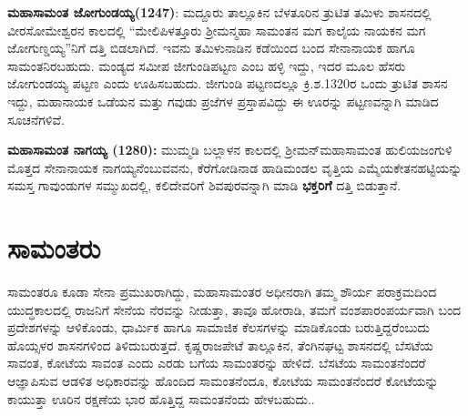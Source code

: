 \textbf{ಮಹಾಸಾಮಂತ ಜೋಗುಂಡಯ್ಯ(1247)}: ಮದ್ದೂರು ತಾಲ್ಲೂಕಿನ ಬೆಳತೂರಿನ ತ್ರುಟಿತ ತಮಿಳು ಶಾಸನದಲ್ಲಿ ವೀರಸೋಮೇಶ್ವರನ ಕಾಲದಲ್ಲಿ “ಮೇಲಿಪಿಳತ್ತೂರು ಶ‍್ರೀಮನ್ಮಹಾ ಸಾಮಂತನ ಮಗ ಕಾಲೈಯ ನಾಯಕನ ಮಗ \hbox{ಜೋಗುಣ್ಡಯ್ಯ”}\-ನಿಗೆ ದತ್ತಿ ಬಿಡಲಾಗಿದೆ. ಇವನು ತಮಿಳುನಾಡಿನ ಕಡೆಯಿಂದ ಬಂದ ಸೇನಾನಾಯಕ ಹಾಗೂ ಸಾಮಂತನಿರಬಹುದು. ಮಂಡ್ಯದ ಸಮೀಪ ಜೀಗುಂಡಿಪಟ್ಟಣ ಎಂಬ ಹಳ್ಳಿ ಇದ್ದು, ಇದರ ಮೂಲ ಹೆಸರು ಜೋಗುಂಡಯ್ಯ ಪಟ್ಟಣ ಎಂದು ಊಹಿಸಬಹುದು. ಜೀಗುಂಡಿ ಪಟ್ಟಣದಲ್ಲೂ ಕ್ರಿ.ಶ.1320ರ ಒಂದು ತ್ರುಟಿತ ಶಾಸನ ಇದ್ದು, ಮಹಾನಾಯಕ ಒಡೆಯನ ಮತ್ತು ಗವುಡು ಪ್ರಜೆಗಳ ಪ್ರಸ್ತಾಪವಿದ್ದು ಈ ಊರನ್ನು ಪಟ್ಟಣವನ್ನಾಗಿ ಮಾಡಿದ ಸೂಚನೆಗಳಿವೆ.

\textbf{ಮಹಾಸಾಮಂತ ನಾಗಯ್ಯ (1280):} ಮುಮ್ಮಡಿ ಬಲ್ಲಾಳನ ಕಾಲದಲ್ಲಿ ಶ‍್ರೀಮನ್​ ಮಹಾಸಾಮಂತ ಹುಲಿಯಜಂಗುಳಿ ಮೊತ್ತದ ಸೇನಾನಾಯಕ ನಾಗಯ್ಯನೆಂಬುವವನು, ಕೆರೆಗೋಡಿನಾಡ ಹಾಡಿಮಂಡಲ ವೃತ್ತಿಯ ಎಮ್ಮೆಯಕೇತನಹಟ್ಟಿಯನ್ನು ಸಮಸ್ತ ಗಾವುಂಡುಗಳ ಸಮ್ಮುಖದಲ್ಲಿ, ಕಲಿದೇವರಿಗೆ ಶಿವಪುರವನ್ನಾಗಿ ಮಾಡಿ \textbf{ಭಕ್ತರಿಗೆ }ದತ್ತಿ ಬಿಡುತ್ತಾನೆ.


\section*{ಸಾಮಂತರು}

ಸಾಮಂತರೂ ಕೂಡಾ ಸೇನಾ ಪ್ರಮುಖರಾಗಿದ್ದು, ಮಹಾಸಾಮಂತರ ಅಧೀನರಾಗಿ ತಮ್ಮ ಶೌರ್ಯ ಪರಾಕ್ರಮದಿಂದ ಯುದ್ಧಕಾಲದಲ್ಲಿ ರಾಜನಿಗೆ ಸೇನೆಯ ನೆರವನ್ನು ನೀಡುತ್ತಾ, ತಾವೂ ಹೋರಾಡಿ, ತಮಗೆ ವಂಶಪಾರಂಪರ್ಯವಾಗಿ ಬಂದ ಪ್ರದೇಶಗಳನ್ನು ಆಳಿಕೊಂಡು, ಧಾರ್ಮಿಕ ಹಾಗೂ ಸಾಮಾಜಿಕ ಕೆಲಸಗಳನ್ನು ಮಾಡಿಕೊಂಡು ಬರುತ್ತಿದ್ದರೆಂಬುದು ಹೊಯ್ಸಳರ ಶಾಸನಗಳಿಂದ ತಿಳಿದುಬರುತ್ತದೆ. ಕೃಷ್ಣರಾಜಪೇಟೆ ತಾಲ್ಲೂಕಿನ, ತೆಂಗಿನಘಟ್ಟ ಶಾಸನದಲ್ಲಿ ಬೆಸಟೆಯ ಸಾವಂತ, ಕೋಟೆಯ ಸಾವಂತ ಎಂದು ಎರಡು ಬಗೆಯ ಸಾಮಂತರನ್ನು ಹೇಳಿದೆ. ಬೆಸಟೆಯ ಸಾಮಂತನೆಂದರೆ ಆಜ್ಞಾಪಿಸುವ ಆಡಳಿತ ಅಧಿಕಾರವನ್ನು ಹೊಂದಿದ ಸಾಮಂತನೆಂದೂ, ಕೋಟೆಯ ಸಾಮಂತನೆಂದರೆ ಕೋಟೆಯನ್ನು ಕಾಯುತ್ತಾ ಊರಿನ ರಕ್ಷಣೆಯ ಭಾರ ಹೊತ್ತಿದ್ದ ಸಾಮಂತನೆಂದು ಹೇಳಬಹುದು..

